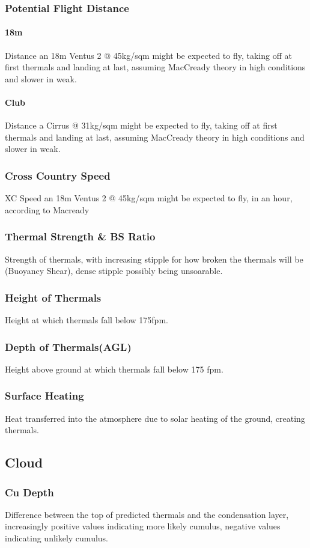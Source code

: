\documentclass[11pt,a4paper]{article}
\begin{document}
\subsubsection{Potential Flight Distance}
\paragraph{18m}Distance an 18m Ventus 2 @ 45kg/sqm might be expected to fly, taking off at first thermals and landing at last, assuming MacCready theory in high conditions and slower in weak.
\paragraph{Club}Distance a Cirrus @ 31kg/sqm might be expected to fly, taking off at first thermals and landing at last, assuming MacCready theory in high conditions and slower in weak.
\subsubsection{Cross Country Speed}
XC Speed an 18m Ventus 2 @ 45kg/sqm might be expected to fly, in an hour, according to Macready
\subsubsection{Thermal Strength \& BS Ratio}
Strength of thermals, with increasing stipple for how broken the thermals will be (Buoyancy Shear), dense stipple possibly being unsoarable.
\subsubsection{Height of Thermals}
Height at which thermals fall below 175fpm.
\subsubsection{Depth of Thermals(AGL)}
Height above ground at which thermals fall below 175 fpm.
\subsubsection{Surface Heating}
Heat transferred into the atmosphere due to solar heating of the ground, creating thermals.
\subsection{Cloud}
\subsubsection{Cu Depth}
Difference between the top of predicted thermals and the condensation layer, increasingly positive values indicating more likely cumulus, negative values indicating unlikely cumulus.
\end{document}
